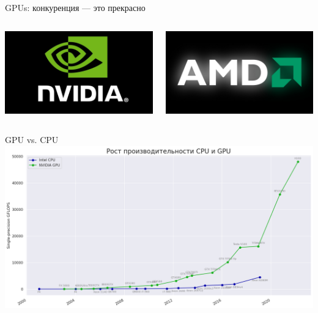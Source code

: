 \documentclass[aspectratio=169, professionalfonts]{beamer}
\begin{document}
\begin{frame}{GPUs: конкуренция --- это прекрасно}
    \begin{columns}
        \begin{column}{.49\linewidth}
            \centering
            \includegraphics[width=\linewidth]{figures/fig56-nvidia.jpg}
        \end{column}
        \begin{column}{.49\linewidth}
            \centering
            \includegraphics[width=\linewidth]{figures/fig57-amd.jpg}
        \end{column}
    \end{columns}
\end{frame}

\begin{frame}{GPU vs. CPU}
    \centering
    \includegraphics[width=.92\linewidth]{figures/fig58-cpu-gpu.jpg}
\end{frame}
\end{document}
